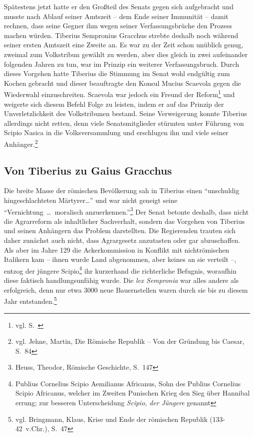 \documentclass[
    12pt,
    smallheadings,
    ]{scrreprt}
\newcommand{\RM}[1]{\MakeUppercase{\romannumeral #1}}
\begin{document}
Spätestens jetzt hatte er den Großteil des Senats gegen sich aufgebracht und musste nach Ablauf seiner Amtszeit -- dem Ende seiner Immunität -- damit rechnen, dass seine Gegner ihm wegen seiner Verfassungsbrüche den Prozess machen würden.
Tiberius Sempronius Gracchus strebte deshalb noch während seiner ersten Amtszeit eine Zweite an.
Es war zu der Zeit schon unüblich genug, zweimal zum Volkstribun gewählt zu werden, aber dies gleich in zwei aufeinander folgenden Jahren zu tun, war im Prinzip ein weiterer Verfassungsbruch.
Durch dieses Vorgehen hatte Tiberius die Stimmung im Senat wohl endgültig zum Kochen gebracht und dieser beauftragte den Konsul Mucius Scaevola gegen die Wiederwahl einzuschreiten.
Scaevola war jedoch ein Freund der Reform\footnote{vgl. S.~\pageref{scaevola}}
und weigerte sich diesem Befehl Folge zu leisten, indem er auf das Prinzip der Unverletzlichkeit des Volkstribunen bestand.
Seine Verweigerung konnte Tiberius allerdings nicht retten, denn viele Senatsmitglieder stürmten unter Führung von Scipio Nasica in die Volksversammlung und erschlugen ihn und viele seiner Anhänger.\footnote{vgl. Jehne, Martin, Die Römische Republik -- Von der Gründung bis Caesar, S.~84}



        \subsection{Von Tiberius zu Gaius Gracchus}
Die breite Masse der römischen Bevölkerung sah in Tiberius einen "`unschuldig hingeschlachteten Märtyrer\lbrack\ldots\rbrack"' und war nicht geneigt seine "`Vernichtung~\lbrack\ldots\rbrack~moralisch anzuerkennen."'\footnote{Heuss, Theodor, Römische Geschichte, S.~147}
Der Senat betonte deshalb, dass nicht die Agrarreform als inhaltlicher Sachverhalt, sondern das Vorgehen von Tiberius und seinen Anhängern das Problem darstellten.
Die Regierenden trauten sich daher zunächst auch nicht, dass Agrargesetz anzutasten oder gar abzuschaffen.
Als aber im Jahre 129 die Ackerkommission in Konflikt mit nichtrömischen Italikern kam -- ihnen wurde Land abgenommen, aber keines an sie verteilt --, entzog der jüngere Scipio\footnote{Publius Cornelius Scipio Aemilianus Africanus, Sohn des Publius Cornelius Scipio Africanus, welcher im Zweiten Punischen Krieg den Sieg über Hannibal errung; zur besseren Unterscheidung \textit{Scipio, der Jüngere} genannt}
ihr kurzerhand die richterliche Befugnis, woraufhin diese faktisch handlungsunfähig wurde.
Die \textit{lex Sempronia} war alles andere als erfolgreich, denn nur etwa 3000 neue Bauernstellen waren durch sie bis zu diesem Jahr entstanden.\footnote{vgl. Bringmann, Klaus, Krise und Ende der römischen Republik (133-42~v.Chr.), S.~47}
\end{document}
